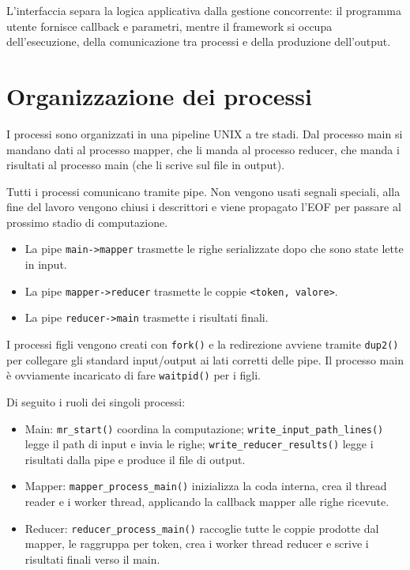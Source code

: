 \documentclass[11pt,a4paper]{article}
\begin{document}
L'interfaccia separa la logica applicativa dalla gestione concorrente: il programma utente fornisce callback e parametri, mentre il framework si occupa dell'esecuzione, della comunicazione tra processi e della produzione dell'output.

\section{Organizzazione dei processi}

I processi sono organizzati in una pipeline UNIX a tre stadi. Dal processo main si mandano dati al processo mapper, che li manda al processo reducer, che manda i risultati al processo main (che li scrive sul file in output).

Tutti i processi comunicano tramite pipe. Non vengono usati segnali speciali, alla fine del lavoro vengono chiusi i descrittori e viene propagato l'EOF per passare al prossimo stadio di computazione.

\begin{itemize}
    \item La pipe \texttt{main->mapper} trasmette le righe serializzate dopo che sono state lette in input.
    \item La pipe \texttt{mapper->reducer} trasmette le coppie \texttt{<token, valore>}.
    \item La pipe \texttt{reducer->main} trasmette i risultati finali.
\end{itemize}

I processi figli vengono creati con \texttt{fork()} e la redirezione avviene tramite \texttt{dup2()} per collegare gli standard input/output ai lati corretti delle pipe. Il processo main è ovviamente incaricato di fare \texttt{waitpid()} per i figli.

Di seguito i ruoli dei singoli processi:

\begin{itemize}
    \item Main: \texttt{mr\_start()} coordina la computazione; \texttt{write\_input\_path\_lines()} legge il path di input e invia le righe; \texttt{write\_reducer\_results()} legge i risultati dalla pipe e produce il file di output.
    \item Mapper: \texttt{mapper\_process\_main()} inizializza la coda interna, crea il thread reader e i worker thread, applicando la callback mapper alle righe ricevute.
    \item Reducer: \texttt{reducer\_process\_main()} raccoglie tutte le coppie prodotte dal mapper, le raggruppa per token, crea i worker thread reducer e scrive i risultati finali verso il main.
\end{itemize}
\end{document}
